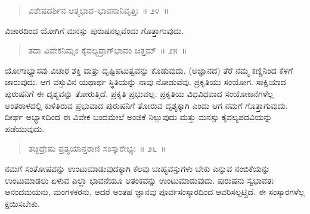 \vspace{-0.2cm}

\begin{verse}
ವಿಶೇಷದರ್ಶಿನ ಆತ್ಮಭಾವ–ಭಾವನಾನಿವೃತ್ತಿಃ~॥ ೨೪~॥
\end{verse}

\vspace{-0.38cm}


\vspace{0.2cm}

ವಿಚಾರದಿಂದ ಯೋಗಿಗೆ ಮನಸ್ಸು ಪುರುಷನಲ್ಲವೆಂದು ಗೊತ್ತಾಗುವುದು. 

\vspace{-0.2cm}

\begin{verse}
ತದಾ ವಿವೇಕನಿಮ್ನಂ ಕೈವಲ್ಯಪ್ರಾಗ್​ಭಾವಂ ಚಿತ್ತಮ್​~॥ ೨೫~॥
\end{verse}

\vspace{-0.34cm}


\vspace{0.1cm}

ಯೋಗಾಭ್ಯಾಸವು ವಿಚಾರ ಶಕ್ತಿ ಮತ್ತು ದೃಷ್ಟಿಪಟುತ್ವವನ್ನು ಕೊಡುವುದು. (ಅಜ್ಞಾನದ) ತೆರೆ ನಮ್ಮ ಕಣ್ಣಿನಿಂದ ಕೆಳಗೆ ಜಾರುವುದು. ಆಗ ವಸ್ತುವಿನ ಯಥಾರ್ಥ ಸ್ಥಿತಿಯನ್ನು ನಾವು ನೋಡುವೆವು. ಪ್ರಕೃತಿಯು ಸಂಯೋಗ. ಸಾಕ್ಷಿಯಾದ ಪುರುಷನಿಗೆ ಈ ದೃಶ್ಯವನ್ನು ತೋರುತ್ತಿದೆ. ಪ್ರಕೃತಿ ಪ್ರಭುವಲ್ಲ. ಪ್ರಕೃತಿಯ ವಿಧವಿಧವಾದ ಸಂಯೋಜನೆಗಳೆಲ್ಲ ಅಂತರಾಳದಲ್ಲಿ ಕುಳಿತಿರುವ ಪ್ರಭುವಾದ ಪುರುಷನಿಗೆ ತೋರುವ ದೃಶ್ಯಕ್ಕಾಗಿ ಎಂದು ಆಗ ನಮಗೆ ಗೊತ್ತಾಗುವುದು. ದೀರ್ಘ ಅಭ್ಯಾಸದಿಂದ ಈ ವಿವೇಕ ಬಂದಮೇಲೆ ಅಂಜಿಕೆ ನಿಲ್ಲುವುದು ಮತ್ತು ಮನಸ್ಸು ಕೈವಲ್ಯಪದವಿಯನ್ನು ಪಡೆಯುವುದು. 

\vspace{-0.25cm}

\begin{verse}
ತಚ್ಛಿದ್ರೇಷು ಪ್ರತ್ಯಯಾನ್ತರಾಣಿ ಸಂಸ್ಕಾರೇಭ್ಯಃ~॥ ೨೬~॥
\end{verse}

\vspace{-0.3cm}


\vspace{0.1cm}

ನಮಗೆ ಸಂತೋಷವನ್ನು ಉಂಟುಮಾಡುವುದಕ್ಕಾಗಿ ಕೆಲವು ಬಾಹ್ಯವಸ್ತುಗಳು ಬೇಕು ಎನ್ನುವ ನಂಬಿಕೆಯನ್ನು ಉಂಟುಮಾಡಲು ಏಳುವ ಎಲ್ಲಾ ಭಾವನೆಯೂ ಆತಂಕವನ್ನು ಉಂಟುಮಾಡುವುದು. ಪುರುಷನು ಸ್ವಭಾವತಃ ಆನಂದಮಯನು, ಮಂಗಳಕರನು, ಆದರೆ ಅಂತಹ ಜ್ಞಾನವು ಪೂರ್ವಸಂಸ್ಕಾರದಿಂದ ಆವರಿಸಲ್ಪಟ್ಚಿದೆ. ಈ ಸಂಸ್ಕಾರಗಳೆಲ್ಲ ಕ್ಷಯಿಸಬೇಕು. 

